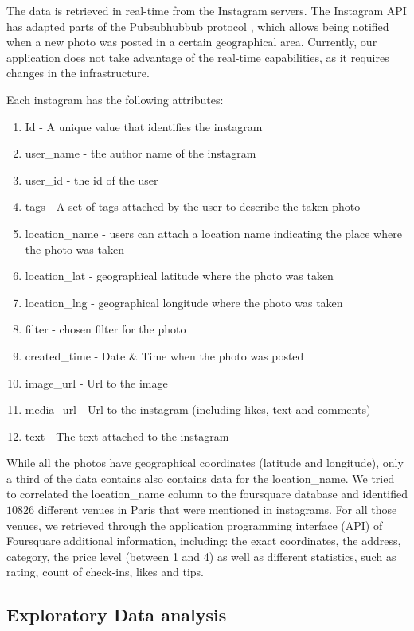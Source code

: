 The data is retrieved in real-time from the Instagram servers. The Instagram API \cite{instagram_api} has adapted parts of the Pubsubhubbub protocol \cite{pubsubhubbub}, which allows being notified when a new photo was posted in a certain geographical area. Currently, our application does not take advantage of the real-time capabilities, as it requires changes in the infrastructure.

Each instagram has the following attributes:
\begin{enumerate}
  \item Id - A unique value that identifies the instagram
  \item user\_name - the author name of the instagram
  \item user\_id - the id of the user
  \item tags - A set of tags attached by the user to describe the taken photo
  \item location\_name - users can attach a location name indicating the place where the photo was taken
  \item location\_lat - geographical latitude where the photo was taken
  \item location\_lng - geographical longitude where the photo was taken
  \item filter - chosen filter for the photo
  \item created\_time - Date \& Time when the photo was posted
  \item image\_url - Url to the image
  \item media\_url - Url to the instagram (including likes, text and comments)
  \item text - The text attached to the instagram
\end{enumerate}

While all the photos have geographical coordinates (latitude and longitude), only a third of the data contains also contains data for the location\_name. We tried to correlated the location\_name column to the foursquare database and identified $10826$ different venues in Paris that were mentioned in instagrams. For all those venues, we retrieved through the application programming interface (API) of Foursquare additional information, including: the exact coordinates, the address, category, the price level (between 1 and 4) as well as different statistics, such as rating, count of check-ins, likes and tips.

\subsection{Exploratory Data analysis}

